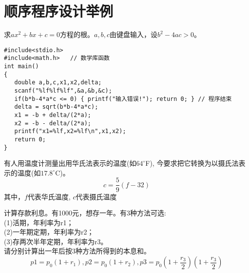 \section{顺序程序设计举例}

\begin{frame}[fragile]
\begin{example}[例3.5 p64]
	求$ax^2+bx+c=0$方程的根。$a,b,c$由键盘输入，设$b^2-4ac>0$。
\end{example}
\begin{lstlisting}
#include<stdio.h>
#include<math.h>   // 数学库函数        
int main()                   
{                            
   double a,b,c,x1,x2,delta;
   scanf("%lf%lf%lf",&a,&b,&c);
   if(b*b-4*a*c <= 0) { printf("输入错误!"); return 0; } // 程序结束
   delta = sqrt(b*b-4*a*c);
   x1 = -b + delta/(2*a);
   x2 = -b - delta/(2*a);
   printf("x1=%lf,x2=%lf\n",x1,x2);
   return 0;           
}                            
\end{lstlisting}
\end{frame}

\begin{frame}[shrink]
\begin{example}[例3.1 p37]
	有人用温度计测量出用华氏法表示的温度(如$64^\circ$F), 
	今要求把它转换为以摄氏法表示的温度(如$17.8^\circ$C)。
	\[ c=\frac{5}{9}(f-32) \]
	其中，$f$代表华氏温度, $c$代表摄氏温度
\end{example}
\begin{example}[例3.2 p38]
	计算存款利息。有1000元，想存一年。有3种方法可选:\\
	(1)活期，年利率为r1；\\
	(2)一年期定期，年利率为r2；\\
	(3)存两次半年定期，年利率为r3。\\
	请分别计算出一年后按3种方法所得到的本息和。\\
	\[p1=p_0(1+r_1),p2=p_0(1+r_2),p3=p_0(1+\frac{r_3}{2})(1+\frac{r_3}{2}) \]
\end{example}
\end{frame}




